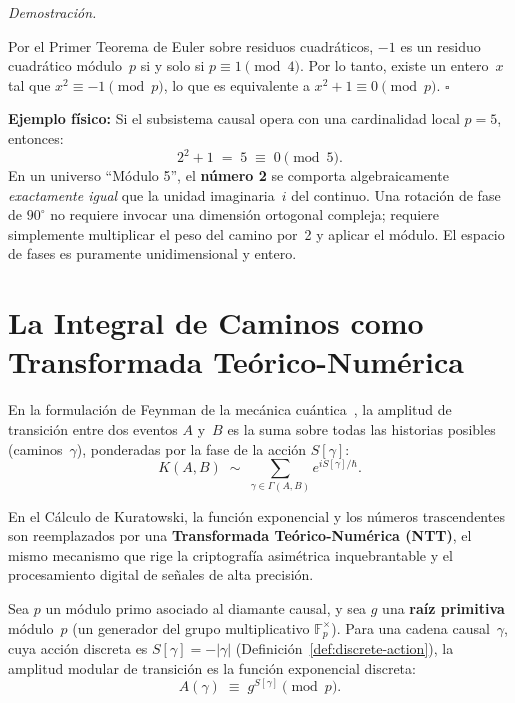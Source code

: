 \documentclass[11pt, a4paper, openany]{book}
\renewenvironment{proof}[1][Demostraci\'on]{%
  \par\noindent\textit{#1.}\quad
}{\hfill$\square$\par\medskip}
\begin{document}
\begin{proof}
Por el Primer Teorema de Euler sobre residuos cuadr\'aticos, $-1$ es un
residuo cuadr\'atico m\'odulo~$p$ si y solo si $p \equiv 1 \pmod 4$.
Por lo tanto, existe un entero~$x$ tal que $x^2 \equiv -1 \pmod p$, lo
que es equivalente a $x^2 + 1 \equiv 0 \pmod p$.
\end{proof}

\noindent
\textbf{Ejemplo f\'isico:} Si el subsistema causal opera con una
cardinalidad local $p = 5$, entonces:
\[
  2^2 + 1 \;=\; 5 \;\equiv\; 0 \pmod 5.
\]
En un universo ``M\'odulo 5'', el \textbf{n\'umero 2} se comporta
algebraicamente \emph{exactamente igual} que la unidad imaginaria~$i$
del continuo. Una rotaci\'on de fase de $90^\circ$ no requiere invocar
una dimensi\'on ortogonal compleja; requiere simplemente multiplicar el
peso del camino por~2 y aplicar el m\'odulo. El espacio de fases es
puramente unidimensional y entero.

\section{La Integral de Caminos como Transformada Te\'orico-Num\'erica}
\label{sec:ntt}

En la formulaci\'on de Feynman de la mec\'anica
cu\'antica~\cite{feynman1948}, la amplitud de transici\'on entre dos
eventos $A$ y~$B$ es la suma sobre todas las historias posibles
(caminos~$\gamma$), ponderadas por la fase de la acci\'on
$S[\gamma]$:
\begin{equation}
  K(A,B) \;\sim\; \sum_{\gamma \in \Gamma(A,B)} e^{i S[\gamma] / \hbar}.
  \label{eq:feynman-path}
\end{equation}

En el C\'alculo de Kuratowski, la funci\'on exponencial y los n\'umeros
trascendentes son reemplazados por una \textbf{Transformada
Te\'orico-Num\'erica (NTT)}, el mismo mecanismo que rige la
criptograf\'ia asim\'etrica inquebrantable y el procesamiento digital de
se\~nales de alta precisi\'on.

\begin{definition}
\label{def:modular-amplitude}
Sea $p$ un m\'odulo primo asociado al diamante causal, y sea $g$ una
\textbf{ra\'iz primitiva} m\'odulo~$p$ (un generador del grupo
multiplicativo $\mathbb{F}_p^\times$). Para una cadena causal~$\gamma$,
cuya acci\'on discreta es $S[\gamma] = -|\gamma|$
(Definici\'on~\ref{def:discrete-action}), la amplitud modular de
transici\'on es la funci\'on exponencial discreta:
\begin{equation}
  \boxed{\;
  A(\gamma) \;\equiv\; g^{S[\gamma]} \pmod p.
  \;}
  \label{eq:modular-amplitude}
\end{equation}
\end{definition}
\end{document}
